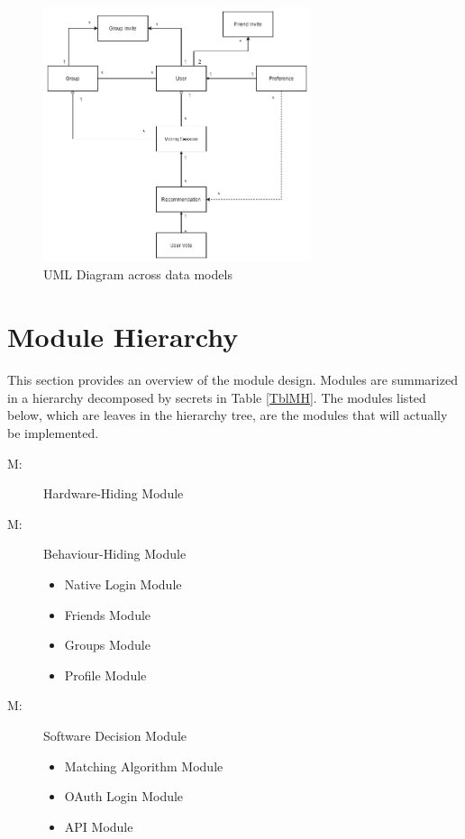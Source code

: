 \documentclass[12pt, titlepage]{article}
\newcounter{mnum}
\newcommand{\mthemnum}{M\themnum}
\begin{document}
\begin{figure}[H]
	\centering
	\includegraphics[width=0.7\textwidth]{uml-diagram.png}
	\caption{UML Diagram across data models}
	\label{FigUH}
\end{figure}

\section{Module Hierarchy} \label{SecMH}

This section provides an overview of the module design. Modules are summarized
in a hierarchy decomposed by secrets in Table \ref{TblMH}. The modules listed
below, which are leaves in the hierarchy tree, are the modules that will
actually be implemented.

\begin{description}
\item [ \mthemnum \label{mHH}:] Hardware-Hiding Module
\item [ \mthemnum \label{mBH}:] Behaviour-Hiding Module
	\begin{itemize}
		\item [\refstepcounter{mnum} \mthemnum \label{mNL}:] Native Login Module
		\item [\refstepcounter{mnum} \mthemnum \label{mF}:] Friends Module
		\item [\refstepcounter{mnum} \mthemnum \label{mG}:] Groups Module
		\item [\refstepcounter{mnum} \mthemnum \label{mP}:] Profile Module
	\end{itemize}
\item [ \mthemnum \label{mSD}:] Software Decision Module
	\begin{itemize}
		\item [\refstepcounter{mnum} \mthemnum \label{mMA}:] Matching Algorithm Module
		\item [\refstepcounter{mnum} \mthemnum \label{mOL}:] OAuth Login Module
		\item [\refstepcounter{mnum} \mthemnum \label{mA}:] API Module
	\end{itemize}
\end{description}
\end{document}
